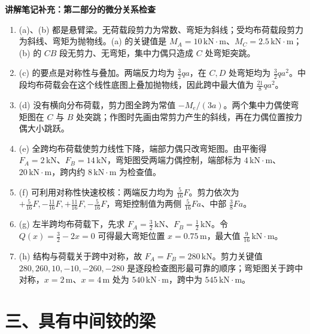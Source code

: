 \begin{notecard}
\textbf{讲解笔记补充：第二部分的微分关系检查}

\begin{enumerate}
  \item (a)、(b) 都是悬臂梁。无荷载段剪力为常数、弯矩为斜线；受均布荷载段剪力为斜线、弯矩为抛物线。(a) 的关键值是 \(M_A=10\,\mathrm{kN\cdot m}\)、\(M_C=2.5\,\mathrm{kN\cdot m}\)；(b) 的 \(CB\) 段无剪力、无弯矩，集中力偶只造成 \(C\) 处弯矩突跳。

  \item (c) 的要点是对称性与叠加。两端反力均为 \(\frac32qa\)，在 \(C,D\) 处弯矩均为 \(\frac32qa^2\)。中段均布荷载会在这个线性底图上叠加抛物线，因此跨中最大值为 \(\frac{21}{8}qa^2\)。

  \item (d) 没有横向分布荷载，剪力图全跨为常值 \(-M_e/(3a)\)。两个集中力偶使弯矩图在 \(C\) 与 \(B\) 处突跳；作图时先画由常剪力产生的斜线，再在力偶位置按力偶大小跳跃。

  \item (e) 全跨均布荷载使剪力线性下降，端部力偶只改弯矩图。由平衡得 \(F_A=2\,\mathrm{kN}\)、\(F_B=14\,\mathrm{kN}\)，弯矩图受两端力偶控制，端部标为 \(4\,\mathrm{kN\cdot m}\)、\(20\,\mathrm{kN\cdot m}\)，跨内约 \(8\,\mathrm{kN\cdot m}\) 为检查值。

  \item (f) 可利用对称性快速校核：两端反力均为 \(\frac{5}{16}F\)。剪力依次为 \(+\frac{5}{16}F,-\frac{11}{16}F,+\frac{11}{16}F,-\frac{5}{16}F\)，弯矩控制值为两侧 \(\frac{5}{16}Fa\)、中部 \(\frac38Fa\)。

  \item (g) 左半跨均布荷载下，先求 \(F_A=\frac32\,\mathrm{kN}\)、\(F_B=\frac12\,\mathrm{kN}\)。令 \(Q(x)=\frac32-2x=0\) 可得最大弯矩位置 \(x=0.75\,\mathrm{m}\)，最大值 \(\frac{9}{16}\,\mathrm{kN\cdot m}\)。

  \item (h) 结构与荷载关于跨中对称，故 \(F_A=F_B=280\,\mathrm{kN}\)。剪力关键值 \(280,260,10,-10,-260,-280\) 是逐段检查图形最可靠的顺序；弯矩图关于跨中对称，\(x=2\,\mathrm{m}\)、\(x=4\,\mathrm{m}\) 处为 \(540\,\mathrm{kN\cdot m}\)，跨中为 \(545\,\mathrm{kN\cdot m}\)。
\end{enumerate}
\end{notecard}

\section{三、具有中间铰的梁}

